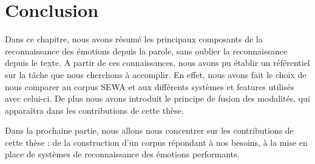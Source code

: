 \section{Conclusion}
Dans ce chapitre, nous avons résumé les principaux composants de la reconnaissance des émotions depuis la parole, sans oublier la reconnaissance depuis le texte. A partir de ces connaissances, nous avons pu établir un référentiel sur la tâche que nous cherchons à accomplir. En effet, nous avons fait le choix de nous comparer au corpus SEWA et aux différents systèmes et features utilisés avec celui-ci. De plus nous avons introduit le principe de fusion des modalités, qui apparaîtra dans les contributions de cette thèse.

Dans la prochaine partie, nous allons nous concentrer sur les contributions de cette thèse : de la construction d'un corpus répondant à nos besoins, à la mise en place de systèmes de reconnaissance des émotions performants.
